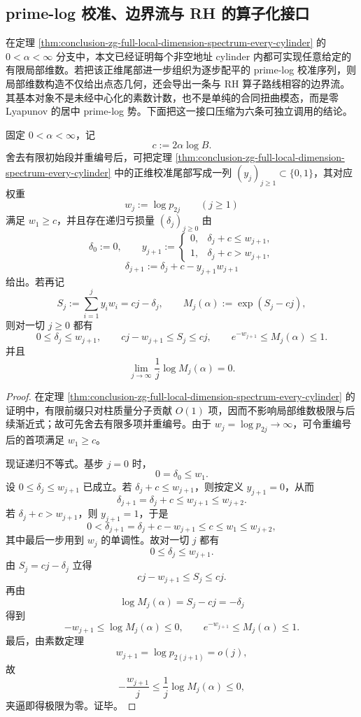 \subsection{prime-log 校准、边界流与 RH 的算子化接口}\label{subsec:conclusion-prime-log-calibration-rh-boundary-current}
在定理 \ref{thm:conclusion-zg-full-local-dimension-spectrum-every-cylinder} 的 \(0<\alpha<\infty\) 分支中，本文已经证明每个非空地址 cylinder 内都可实现任意给定的有限局部维数。若把该正维尾部进一步组织为逐步配平的 prime-log 校准序列，则局部维数构造不仅给出点态几何，还会导出一条与 RH 算子路线相容的边界流。其基本对象不是未经中心化的素数计数，也不是单纯的合同扭曲模态，而是零 Lyapunov 的居中 prime-log 势。下面把这一接口压缩为六条可独立调用的结论。

\begin{theorem}\label{thm:conclusion-prime-log-zero-lyapunov-calibration}
固定 \(0<\alpha<\infty\)，记
\[
c:=2\alpha\log B.
\]
舍去有限初始段并重编号后，可把定理 \ref{thm:conclusion-zg-full-local-dimension-spectrum-every-cylinder} 中的正维校准尾部写成一列 \((y_j)_{j\ge 1}\subset\{0,1\}\)，其对应权重
\[
w_j:=\log p_{2j}
\qquad (j\ge 1)
\]
满足 \(w_1\ge c\)，并且存在递归亏损量 \((\delta_j)_{j\ge 0}\) 由
\[
\delta_0:=0,
\qquad
y_{j+1}:=
\begin{cases}
0,& \delta_j+c\le w_{j+1},\\[4pt]
1,& \delta_j+c>w_{j+1},
\end{cases}
\]
\[
\delta_{j+1}:=\delta_j+c-y_{j+1}w_{j+1}
\]
给出。若再记
\[
S_j:=\sum_{i=1}^{j}y_i w_i=cj-\delta_j,
\qquad
M_j(\alpha):=\exp(S_j-cj),
\]
则对一切 \(j\ge 0\) 都有
\[
0\le \delta_j\le w_{j+1},
\qquad
cj-w_{j+1}\le S_j\le cj,
\qquad
e^{-w_{j+1}}\le M_j(\alpha)\le 1.
\]
并且
\[
\lim_{j\to\infty}\frac1j\log M_j(\alpha)=0.
\]
\end{theorem}
\begin{proof}
在定理 \ref{thm:conclusion-zg-full-local-dimension-spectrum-every-cylinder} 的证明中，有限前缀只对柱质量分子贡献 \(O(1)\) 项，因而不影响局部维数极限与后续渐近式；故可先舍去有限多项并重编号。由于 \(w_j=\log p_{2j}\to\infty\)，可令重编号后的首项满足 \(w_1\ge c\)。

现证递归不等式。基步 \(j=0\) 时，
\[
0=\delta_0\le w_1.
\]
设 \(0\le \delta_j\le w_{j+1}\) 已成立。若 \(\delta_j+c\le w_{j+1}\)，则按定义 \(y_{j+1}=0\)，从而
\[
\delta_{j+1}=\delta_j+c\le w_{j+1}\le w_{j+2}.
\]
若 \(\delta_j+c>w_{j+1}\)，则 \(y_{j+1}=1\)，于是
\[
0<\delta_{j+1}=\delta_j+c-w_{j+1}\le c\le w_1\le w_{j+2},
\]
其中最后一步用到 \(w_j\) 的单调性。故对一切 \(j\) 都有
\[
0\le \delta_j\le w_{j+1}.
\]
由 \(S_j=cj-\delta_j\) 立得
\[
cj-w_{j+1}\le S_j\le cj.
\]
再由
\[
\log M_j(\alpha)=S_j-cj=-\delta_j
\]
得到
\[
-w_{j+1}\le \log M_j(\alpha)\le 0,
\qquad
e^{-w_{j+1}}\le M_j(\alpha)\le 1.
\]
最后，由素数定理
\[
w_{j+1}=\log p_{2(j+1)}=o(j),
\]
故
\[
-\frac{w_{j+1}}{j}
\le
\frac{1}{j}\log M_j(\alpha)
\le 0,
\]
夹逼即得极限为零。证毕。
\end{proof}

